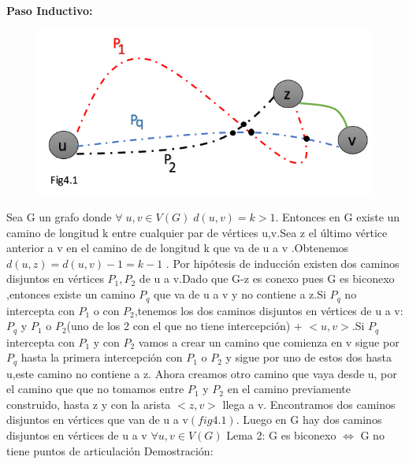 \documentclass{article}
\begin{document}
    \noindent \textbf{Paso Inductivo:}\\
    \begin{figure}[H]
        \includegraphics[scale = 0.327]{4fig1.png}
        \centering
    \end{figure}
    \noindent Sea G un grafo donde $\forall\; u,v\in V(G)\; d(u,v)=k>1$. Entonces en G existe un camino de longitud k entre 
    cualquier par de v\'ertices u,v.Sea z el \'ultimo v\'ertice anterior a v en el camino de de longitud k que va de
    u a v .Obtenemos $d(u,z)=d(u,v)-1=k-1$ . Por hip\'otesis de inducci\'on existen dos caminos disjuntos en v\'ertices 
    $P_{1},P_{2}$ de u a v.Dado que G-z es conexo pues G es biconexo ,entonces existe un camino $P_{q}$ que va de u a v
    y no contiene a z.Si $P_{q}$ no intercepta con $P_{1}$ o con $P_{2}$,tenemos los dos caminos disjuntos en v\'ertices
    de u a v:$P_{q}$ y $P_{1}$ o $P_{2}$(uno de los 2 con el que no tiene intercepci\'on) + $<u,v>$.Si $P_{q}$ intercepta 
    con $P_{1}$ y con $P_{2}$ vamos a crear un camino que comienza en v sigue por $P_{q}$ hasta la primera intercepci\'on con
    $P_{1}$ o $P_{2}$ y sigue por uno de estos dos hasta u,este camino no contiene a z. Ahora creamos  otro camino que vaya 
    desde u, por el camino que que no tomamos entre $P_{1}$ y $P_{2}$ en el camino previamente construido,  hasta z y con la arista $<z,v>$ llega 
    a v. Encontramos dos caminos disjuntos en v\'ertices que van de u a v$(fig4.1)$.\newline
    Luego en G hay dos caminos disjuntos en v\'ertices de u a v $\forall u,v \in V(G)$
    \newline
    \newline
    Lema 2:\newline
    G es biconexo $\Longleftrightarrow$ G no tiene puntos de articulaci\'on \newline
    Demostraci\'on:\newline
\end{document}
